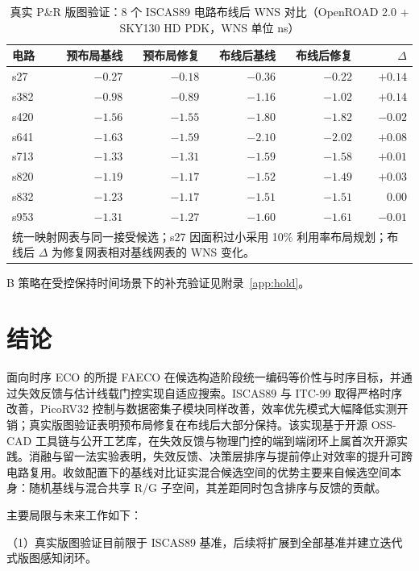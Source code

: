 \documentclass[twocolumn,10pt]{ctexart}
\begin{document}
\begin{table}[tbp]
\centering
\caption{真实 P\&R 版图验证：8 个 ISCAS89 电路布线后 WNS 对比（OpenROAD 2.0 + SKY130 HD PDK，WNS 单位 ns）}
\label{tab:pr8}
\footnotesize
\setlength{\tabcolsep}{2pt}
\begin{tabular}{lrrrrr}
\toprule
\textbf{电路} & \textbf{预布局基线} & \textbf{预布局修复} & \textbf{布线后基线} & \textbf{布线后修复} & $\Delta$ \\
\midrule
s27  & $-0.27$ & $-0.18$ & $-0.36$ & $-0.22$ & $+0.14$ \\
s382 & $-0.98$ & $-0.89$ & $-1.16$ & $-1.02$ & $+0.14$ \\
s420 & $-1.56$ & $-1.55$ & $-1.80$ & $-1.82$ & $-0.02$ \\
s641 & $-1.63$ & $-1.59$ & $-2.10$ & $-2.02$ & $+0.08$ \\
s713 & $-1.33$ & $-1.31$ & $-1.59$ & $-1.58$ & $+0.01$ \\
s820 & $-1.19$ & $-1.17$ & $-1.52$ & $-1.49$ & $+0.03$ \\
s832 & $-1.23$ & $-1.17$ & $-1.51$ & $-1.51$ & $0.00$ \\
s953 & $-1.31$ & $-1.27$ & $-1.60$ & $-1.61$ & $-0.01$ \\
\bottomrule
\multicolumn{6}{p{0.92\columnwidth}}{\footnotesize 统一映射网表与同一接受候选；s27 因面积过小采用 10\% 利用率布局规划；布线后 $\Delta$ 为修复网表相对基线网表的 WNS 变化。}\\
\end{tabular}
\end{table}

B 策略在受控保持时间场景下的补充验证见附录~\ref{app:hold}。
\section{结论}\label{sec:conclusion}

面向时序 ECO 的所提 FAECO 在候选构造阶段统一编码等价性与时序目标，并通过失效反馈与估计线载门控实现自适应搜索。ISCAS89 与 ITC-99 取得严格时序改善，PicoRV32 控制与数据密集子模块同样改善，效率优先模式大幅降低实测开销；真实版图验证表明预布局修复在布线后大部分保持。该实现基于开源 OSS-CAD 工具链与公开工艺库，在失效反馈与物理门控的端到端闭环上属首次开源实践。消融与留一法实验表明，失效反馈、决策层排序与提前停止对效率的提升可跨电路复用。收敛配置下的基线对比证实混合候选空间的优势主要来自候选空间本身：随机基线与混合共享 R/G 子空间，其差距同时包含排序与反馈的贡献。

主要局限与未来工作如下：

（1）真实版图验证目前限于 ISCAS89 基准，后续将扩展到全部基准并建立迭代式版图感知闭环。
\end{document}
